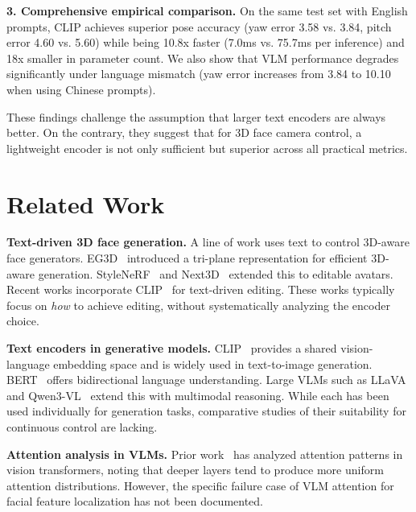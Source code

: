 \noindent\textbf{3. Comprehensive empirical comparison.} On the same test set with English prompts, CLIP achieves superior pose accuracy (yaw error 3.58{\textdegree} vs. 3.84{\textdegree}, pitch error 4.60{\textdegree} vs. 5.60{\textdegree}) while being 10.8x faster (7.0ms vs. 75.7ms per inference) and 18x smaller in parameter count. We also show that VLM performance degrades significantly under language mismatch (yaw error increases from 3.84{\textdegree} to 10.10{\textdegree} when using Chinese prompts).

These findings challenge the assumption that larger text encoders are always better. On the contrary, they suggest that for 3D face camera control, a lightweight encoder is not only sufficient but superior across all practical metrics.

\section{Related Work}
\label{sec:related}

\textbf{Text-driven 3D face generation.} A line of work uses text to control 3D-aware face generators. EG3D~\cite{EG3D} introduced a tri-plane representation for efficient 3D-aware generation. StyleNeRF~\cite{StyleNeRF} and Next3D~\cite{Next3D} extended this to editable avatars. Recent works incorporate CLIP~\cite{CLIPFaceGAN,Text2Face} for text-driven editing. These works typically focus on \emph{how} to achieve editing, without systematically analyzing the encoder choice.

\textbf{Text encoders in generative models.} CLIP~\cite{CLIP} provides a shared vision-language embedding space and is widely used in text-to-image generation. BERT~\cite{BERT} offers bidirectional language understanding. Large VLMs such as LLaVA~\cite{LLaVA} and Qwen3-VL~\cite{Qwen3VL} extend this with multimodal reasoning. While each has been used individually for generation tasks, comparative studies of their suitability for continuous control are lacking.

\textbf{Attention analysis in VLMs.} Prior work~\cite{AttentionSurvey} has analyzed attention patterns in vision transformers, noting that deeper layers tend to produce more uniform attention distributions. However, the specific failure case of VLM attention for facial feature localization has not been documented.

